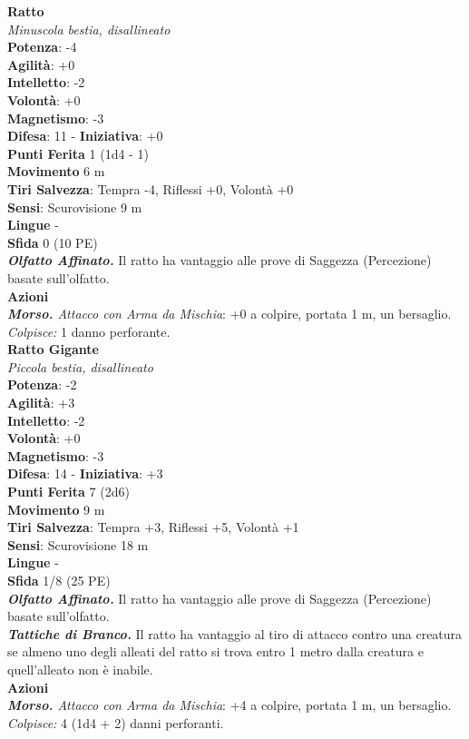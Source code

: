\begin{multicols}{2}
\medskip\textbf{Ratto}\\
\emph{Minuscola bestia, disallineato}\\
\textbf{Potenza}: -4\\
\textbf{Agilità}: +0\\
\textbf{Intelletto}: -2\\
\textbf{Volontà}: +0\\
\textbf{Magnetismo}: -3\\
\textbf{Difesa}: 11 - \textbf{Iniziativa}: +0\\
\textbf{Punti Ferita} 1 (1d4 - 1)\\
\textbf{Movimento} 6 m\\
\textbf{Tiri Salvezza}: Tempra -4, Riflessi +0, Volontà +0 \\
\textbf{Sensi}: Scurovisione 9 m\\
\textbf{Lingue} -\\
\textbf{Sfida} 0 (10 PE)\smallskip\\
\emph{\textbf{Olfatto Affinato.}} Il ratto ha vantaggio alle prove di Saggezza (Percezione) basate sull'olfatto.\\
\smallskip\textbf{Azioni}\\
\emph{\textbf{Morso.} Attacco con Arma da Mischia}: +0 a colpire, portata 1 m, un bersaglio.\\
\emph{Colpisce:} 1 danno perforante.\\

\medskip\textbf{Ratto Gigante}\\
\emph{Piccola bestia, disallineato}\\
\textbf{Potenza}: -2\\
\textbf{Agilità}: +3\\
\textbf{Intelletto}: -2\\
\textbf{Volontà}: +0\\
\textbf{Magnetismo}: -3\\
\textbf{Difesa}: 14 - \textbf{Iniziativa}: +3\\
\textbf{Punti Ferita} 7 (2d6)\\
\textbf{Movimento} 9 m\\
\textbf{Tiri Salvezza}: Tempra +3, Riflessi +5, Volontà +1 \\
\textbf{Sensi}: Scurovisione 18 m\\
\textbf{Lingue} -\\
\textbf{Sfida} 1/8 (25 PE)\smallskip\\
\emph{\textbf{Olfatto Affinato.}} Il ratto ha vantaggio alle prove di Saggezza (Percezione) basate sull'olfatto.\\
\emph{\textbf{Tattiche di Branco.}} Il ratto ha vantaggio al tiro di attacco contro una creatura se almeno uno degli alleati del ratto si trova entro 1 metro dalla creatura e quell'alleato non è inabile. \\
\smallskip\textbf{Azioni}\\
\emph{\textbf{Morso.} Attacco con Arma da Mischia}: +4 a colpire, portata 1 m, un bersaglio.\\
\emph{Colpisce:} 4 (1d4 + 2) danni perforanti.\\


\end{multicols}
